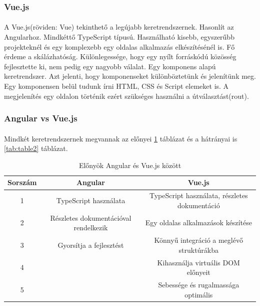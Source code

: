 \documentclass{article}
\begin{document}
	\subsubsection{Vue.js}
	\paragraph{}
	A Vue.js(röviden: Vue) tekinthető a legújabb keretrendszernek. Hasonlít az Angularhoz. Mindkéttő TypeScript típusú. Használható kisebb, egyszerűbb projekteknél és egy komplexebb egy oldalas alkalmazás elkészítésénél is. Fő érdeme a skálázhatóság. Különlegessége, hogy egy nyílt forráskódú közösség fejlesztette ki, nem pedig egy nagyobb válalat. Egy komponens alapú keretrendszer. Azt jelenti, hogy komponenseket különböztetünk és jelenítünk meg. Egy komponensen belül tudunk írni HTML, CSS és Script elemeket is. A megjelenítés egy oldalon történik ezért szükséges használni a útválasztást(rout).\cite{wohlgethan2018supportingweb}
	
	\subsubsection{Angular vs Vue.js}
	\paragraph{}
	Mindkét keretrendszernek megvannak az előnyei \ref{tab:table1} táblázat és a hátrányai is \ref{tab:table2} táblázat. 
	\begin{table}
		\begin{center}
			\caption{Előnyök Angular és Vue.js között \cite{vuevsang} }
			\label{tab:table1}
			\begin{tabular}{c|c|c} 
				\textbf{Sorszám} & \textbf{Angular} & \textbf{Vue.js}\\
				\hline
				1 & TypeScript használata & TypeScript használata, részletes dokumentáció\\
				\hline
				2 & Részletes dokumentációval rendelkezik & Egy oldalas alkalmazások készítése \\
				\hline
				3 & Gyorsítja a fejlesztést & Könnyű integráció a meglévő struktúrákba \\
				\hline
				4 & & Kihasználja virtuális DOM előnyeit \\
				\hline
				5 & & Sebessége és rugalmassága optimális \\
			\end{tabular}
		\end{center}
	\end{table}
\end{document}
